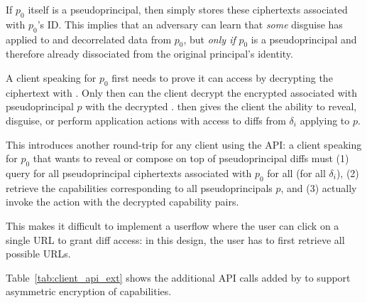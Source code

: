 If $p_0$ itself is a pseudoprincipal, then \sys simply stores these ciphertexts associated with
$p_0$'s ID.  This implies that an adversary can learn that \emph{some} disguise has applied to and
decorrelated data from $p_0$, but \emph{only if} $p_0$ is a pseudoprincipal and therefore already
dissociated from the original principal's identity.  

A client speaking for $p_0$ first needs to prove it can access  by decrypting the 
ciphertext with . Only then can the client decrypt the encrypted 
associated with pseudoprincipal $p$ with the decrypted .  then gives the
client the ability to reveal, disguise, or perform application actions with access to diffs from
$\delta_i$ applying to $p$.

This introduces another round-trip for any client using the API: a client speaking for $p_0$ that
wants to reveal or compose on top of pseudoprincipal diffs must (1) query for all pseudoprincipal
 ciphertexts associated with $p_0$ for all  (for
all $\delta_i$), (2) retrieve the capabilities corresponding to all
pseudoprincipals $p$, and (3) actually invoke the action with the decrypted capability pairs.

This makes it difficult to implement a userflow where the user can click on a single URL to grant \sys diff
access: in this design, the user has to first retrieve all possible URLs.

Table~\ref{tab:client_api_ext} shows the additional API calls added by \sys to support asymmetric
encryption of capabilities. 

